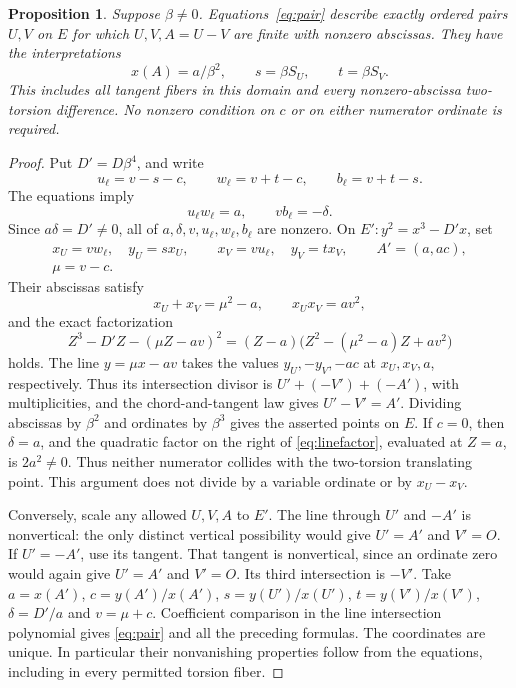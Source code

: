 \documentclass[11pt,a4paper]{article}
\newtheorem{proposition}[theorem]{Proposition}
\begin{document}
\begin{proposition}\label{prop:pair}
Suppose $\beta\ne0$. Equations~\eqref{eq:pair} describe exactly
ordered pairs $U,V$ on $E$ for which $U,V,A=U-V$ are finite with
nonzero abscissas. They have the interpretations
\[
      x(A)=a/\beta^2,\qquad s=\beta S_U,\qquad t=\beta S_V.
\]
This includes all tangent fibers in this domain and every
nonzero-abscissa two-torsion difference. No nonzero condition on $c$
or on either numerator ordinate is required.
\end{proposition}
\begin{proof}
Put $D'=D\beta^4$, and write
\[
      u_\ell=v-s-c,\qquad w_\ell=v+t-c,\qquad b_\ell=v+t-s.
\]
The equations imply
\[
              u_\ell w_\ell=a,\qquad vb_\ell=-\delta.
\]
Since $a\delta=D'\ne0$, all of $a,\delta,v,u_\ell,w_\ell,b_\ell$
are nonzero. On $E':y^2=x^3-D'x$, set
\[
 \begin{gathered}
 x_U=vw_\ell,\quad y_U=sx_U,\qquad
 x_V=vu_\ell,\quad y_V=tx_V,\qquad A'=(a,ac),\\
 \mu=v-c.
 \end{gathered}
\]
Their abscissas satisfy
\[
            x_U+x_V=\mu^2-a,\qquad x_Ux_V=av^2,
\]
and the exact factorization
\begin{equation}\label{eq:linefactor}
 Z^3-D'Z-(\mu Z-av)^2
          =(Z-a)\bigl(Z^2-(\mu^2-a)Z+av^2\bigr)
\end{equation}
holds. The line $y=\mu x-av$ takes the values $y_U,-y_V,-ac$
at $x_U,x_V,a$, respectively. Thus its intersection divisor is
$U'+(-V')+(-A')$, with multiplicities, and the chord-and-tangent
law gives $U'-V'=A'$. Dividing abscissas by $\beta^2$ and ordinates
by $\beta^3$ gives the asserted points on $E$.
If $c=0$, then $\delta=a$, and the quadratic factor on the right of
\eqref{eq:linefactor}, evaluated at $Z=a$, is $2a^2\ne0$.
Thus neither numerator collides with the two-torsion translating
point. This argument does not divide by a variable ordinate or
by $x_U-x_V$.

Conversely, scale any allowed $U,V,A$ to $E'$. The line through
$U'$ and $-A'$ is nonvertical: the only distinct vertical possibility
would give $U'=A'$ and $V'=O$. If $U'=-A'$, use its tangent.
That tangent is nonvertical, since an ordinate zero would again give
$U'=A'$ and $V'=O$. Its third intersection is $-V'$.
Take $a=x(A')$, $c=y(A')/x(A')$, $s=y(U')/x(U')$,
$t=y(V')/x(V')$, $\delta=D'/a$ and $v=\mu+c$.
Coefficient comparison in the line intersection polynomial gives
\eqref{eq:pair} and all the preceding formulas. The coordinates
are unique. In particular their nonvanishing properties follow
from the equations, including in every permitted torsion fiber.


\end{proof}
\end{document}
